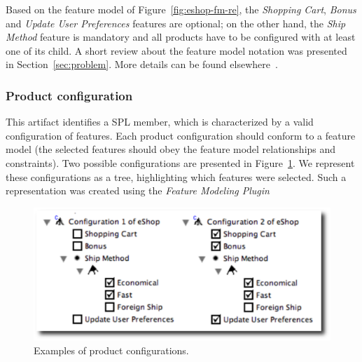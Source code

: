 Based on the feature model of Figure~\ref{fig:eshop-fm-re}, the \emph{Shopping
Cart}, \emph{Bonus} and \emph{Update User Preferences} features are optional;
on the other hand, the \emph{Ship Method} feature is mandatory and all products
have to be configured with at least one of its child. A short review about the
feature model notation was presented in Section~\ref{sec:problem}. More details
can be found elsewhere~\cite{gheyi-alloy-06,Czarnecki:2000aa}.

\subsubsection{Product configuration}\label{subsub:pc}

This artifact identifies a SPL member, which is characterized by a valid
configuration of features. Each product configuration should conform to a
feature model (the selected features should obey the feature model relationships and constraints). Two possible configurations are presented in
Figure~\ref{fig:product-config-01-02}. We represent these configurations as a
tree, highlighting which features were selected. Such a representation was
created using the \emph{Feature Modeling Plugin}~\cite{czarnecki-eclipse-2004}

 \begin{figure}[h]
 \begin{center}
  \includegraphics[scale=0.33]{img/pc-04.eps}
   \caption{Examples of product configurations.}
  \label{fig:product-config-01-02}
  \end{center}
\end{figure}


